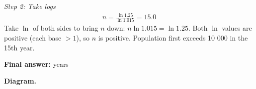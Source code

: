 \documentclass[11pt]{article}
\begin{document}
\textit{Step 2: Take logs}
\[\begin{gathered}
n = \frac{\ln 1.25}{\ln 1.015} = 15.0
\end{gathered}\]
Take \( \ln \) of both sides to bring \( n \) down: \( n\ln 1.015 = \ln 1.25 \). Both \( \ln \) values are positive (each base \( > 1 \)), so \( n \) is positive. Population first exceeds 10 000 in the 15th year.

\begin{answerbox}
\textbf{Final answer:} years
\end{answerbox}
\textbf{Diagram.}

\begin{center}
\end{center}
\end{document}
